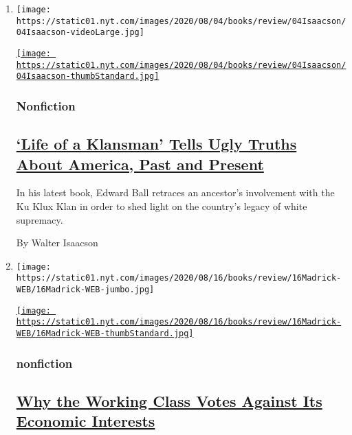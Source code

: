 \begin{enumerate}
\def\labelenumi{\arabic{enumi}.}
\item
  \texttt{[image: https://static01.nyt.com/images/2020/08/04/books/review/04Isaacson/04Isaacson-videoLarge.jpg]}

  \href{/2020/08/04/books/review/life-of-a-klansman-edward-ball.html}{\texttt{[image: https://static01.nyt.com/images/2020/08/04/books/review/04Isaacson/04Isaacson-thumbStandard.jpg]}}

  \hypertarget{nonfiction}{%
  \subsubsection{Nonfiction}\label{nonfiction}}

  \hypertarget{life-of-a-klansman-tells-ugly-truths-about-america-past-and-present}{%
  \subsection{\texorpdfstring{\href{/2020/08/04/books/review/life-of-a-klansman-edward-ball.html}{`Life
  of a Klansman' Tells Ugly Truths About America, Past and
  Present}}{`Life of a Klansman' Tells Ugly Truths About America, Past and Present}}\label{life-of-a-klansman-tells-ugly-truths-about-america-past-and-present}}

  In his latest book, Edward Ball retraces an ancestor's involvement
  with the Ku Klux Klan in order to shed light on the country's legacy
  of white supremacy.

  By Walter Isaacson
\item
  \texttt{[image: https://static01.nyt.com/images/2020/08/16/books/review/16Madrick-WEB/16Madrick-WEB-jumbo.jpg]}

  \href{/2020/07/31/books/review/the-system-robert-reich-break-em-up-zephyr-teachout.html}{\texttt{[image: https://static01.nyt.com/images/2020/08/16/books/review/16Madrick-WEB/16Madrick-WEB-thumbStandard.jpg]}}

  \hypertarget{nonfiction-1}{%
  \subsubsection{nonfiction}\label{nonfiction-1}}

  \hypertarget{why-the-working-class-votes-against-its-economic-interests}{%
  \subsection{\texorpdfstring{\href{/2020/07/31/books/review/the-system-robert-reich-break-em-up-zephyr-teachout.html}{Why
  the Working Class Votes Against Its Economic
  Interests}}{Why the Working Class Votes Against Its Economic Interests}}\label{why-the-working-class-votes-against-its-economic-interests}}


\end{enumerate}
